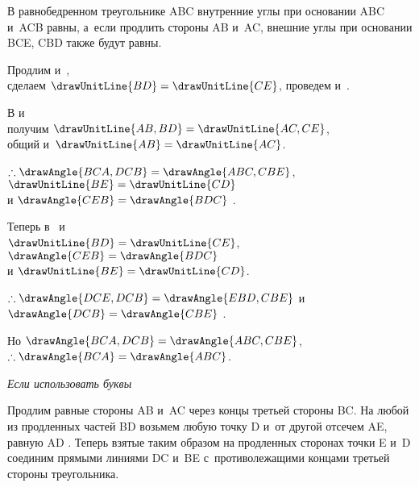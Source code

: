 \documentclass{byrne-book}
\begin{document}
В равнобедренном треугольнике ABC внутренние углы при основании ABC и~ACB равны, а~если продлить стороны AB и~AC, внешние углы при основании BCE, CBD также будут равны.

\begin{center}
Продлим  и~,\\
сделаем $\drawUnitLine{BD} = \drawUnitLine{CE}$, проведем  и~.

В
и
\\
получим $\drawUnitLine{AB,BD} = \drawUnitLine{AC,CE}$,\\
 общий и~$\drawUnitLine{AB} = \drawUnitLine{AC}$.

$\therefore \drawAngle{BCA,DCB} = \drawAngle{ABC,CBE}$, $\drawUnitLine{BE} = \drawUnitLine{CD}$\\
и $\drawAngle{CEB} = \drawAngle{BDC}$ .

Теперь в~ и~\\
$\drawUnitLine{BD} = \drawUnitLine{CE}$, $\drawAngle{CEB} = \drawAngle{BDC}$\\
и $\drawUnitLine{BE} = \drawUnitLine{CD}$.

$\therefore \drawAngle{DCE,DCB} = \drawAngle{EBD,CBE}$
и $\drawAngle{DCB} = \drawAngle{CBE}$ .

Но $\drawAngle{BCA,DCB} = \drawAngle{ABC,CBE}$, $\therefore \drawAngle{BCA} = \drawAngle{ABC}$.
\end{center}

\qedNB

\begin{center}
\emph{Если использовать буквы}
\end{center}

Продлим равные стороны AB и~AC через концы третьей стороны BC. На любой из продленных частей BD возьмем любую точку D и~от другой отсечем AE, равную AD . Теперь взятые таким образом на продленных сторонах точки E и~D соединим прямыми линиями DC и~BE с~противолежащими концами третьей стороны треугольника.
\end{document}
